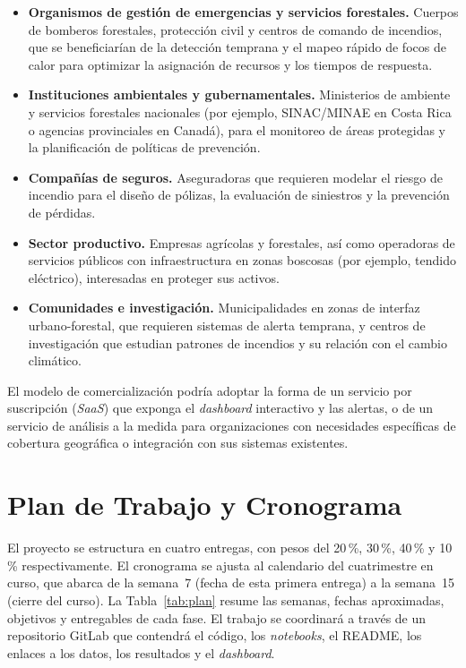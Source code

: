 \begin{itemize}
\item \textbf{Organismos de gestión de emergencias y servicios forestales.} Cuerpos de bomberos forestales, protección civil y centros de comando de incendios, que se beneficiarían de la detección temprana y el mapeo rápido de focos de calor para optimizar la asignación de recursos y los tiempos de respuesta.
\item \textbf{Instituciones ambientales y gubernamentales.} Ministerios de ambiente y servicios forestales nacionales (por ejemplo, SINAC/MINAE en Costa Rica o agencias provinciales en Canadá), para el monitoreo de áreas protegidas y la planificación de políticas de prevención.
\item \textbf{Compañías de seguros.} Aseguradoras que requieren modelar el riesgo de incendio para el diseño de pólizas, la evaluación de siniestros y la prevención de pérdidas.
\item \textbf{Sector productivo.} Empresas agrícolas y forestales, así como operadoras de servicios públicos con infraestructura en zonas boscosas (por ejemplo, tendido eléctrico), interesadas en proteger sus activos.
\item \textbf{Comunidades e investigación.} Municipalidades en zonas de interfaz urbano-forestal, que requieren sistemas de alerta temprana, y centros de investigación que estudian patrones de incendios y su relación con el cambio climático.
\end{itemize}

El modelo de comercialización podría adoptar la forma de un servicio por suscripción (\textit{SaaS}) que exponga el \textit{dashboard} interactivo y las alertas, o de un servicio de análisis a la medida para organizaciones con necesidades específicas de cobertura geográfica o integración con sus sistemas existentes.

\section{Plan de Trabajo y Cronograma}
\label{sec:plan}

El proyecto se estructura en cuatro entregas, con pesos del 20\,\%, 30\,\%, 40\,\% y 10\,\% respectivamente. El cronograma se ajusta al calendario del cuatrimestre en curso, que abarca de la semana~7 (fecha de esta primera entrega) a la semana~15 (cierre del curso). La Tabla~\ref{tab:plan} resume las semanas, fechas aproximadas, objetivos y entregables de cada fase. El trabajo se coordinará a través de un repositorio GitLab que contendrá el código, los \textit{notebooks}, el README, los enlaces a los datos, los resultados y el \textit{dashboard}.


